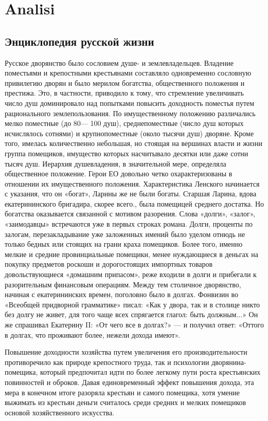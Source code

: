 \chapter{Analisi } %
\label{Analisi} %

\section{Энциклопедия русской жизни}

Русское  дворянство было сословием душе- и землевладельцев. 
Владение поместьями и крепостными крестьянами составляло одновременно сословную привилегию дворян  и было мерилом богатства, общественного положения 
и престижа. 
Это, в частности, приводило к тому, что  стремление увеличивать число душ доминировало над  попытками повысить доходность поместья путем рационального землепользования.
По имущественному положению различались мелко поместные (до 80— 100 душ), среднепоместные (число душ которых исчислялось сотнями) и крупнопоместные 
(около тысячи душ) дворяне. 
Кроме того, имелась количественно небольшая, но стоящая на вершинах 
власти и жизни группа помещиков, имущество которых насчитывало десятки или даже сотни тысяч душ. Иерархия душевладения, в значительной мере, определяла общественное положение. 
Герои ЕО довольно четко охарактеризованы в отношении их имущественного положения. Характеристика Ленского начинается с указания, что он «богат», Ларины же не были богаты. 
Старшая Ларина, вдова екатерининского бригадира, скорее всего., была помещицей среднего достатка. 
Но богатства оказывается связанной с мотивом разорения. Слова «долги», «залог», «заимодавцы» встречаются уже в первых строках романа.
 Долги, проценты по залогам, перезакладывание уже заложенных имений было уделом отнюдь не только бедных или стоящих на грани краха помещиков. Более  того, именно мелкие и средние провинциальные помещики, менее нуждающиеся в деньгах на покупку предметов роскоши и дорогостоящих импортных товаров довольствующиеся «домашним припасом», реже входили в долги и прибегали к разорительным финансовым операциям. Между тем столичное дворянство, начиная с екатерининских времен, поголовно было в долгах. 
Фонвизин во «Всеобщей придворной грамматике» писал: «Как у двора, так и в столице никто без долгу не живет, для того чаще всех спрягается глагол: быть должным...»
Он же спрашивал Екатерину II: «От чего все в долгах?» — и получил ответ: «Оттого в долгах, что проживают более, нежели дохода имеют».

 Повышение доходности хозяйства путем увеличения его производительности противоречило как природе крепостного труда, так и психологии дворянина-помещика, который предпочитал идти по более легкому пути роста крестьянских повинностей и оброков. Давая единовременный эффект повышения дохода, эта мера в конечном итоге разоряла крестьян и самого помещика, хотя умение выжимать из крестьян деньги считалось среди средних и мелких помещиков основой хозяйственного искусства. 
 
